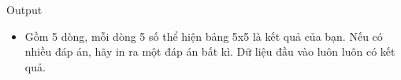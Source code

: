 Output
\begin{itemize}
	\item Gồm 5 dòng, mỗi dòng 5 số thể hiện bảng 5x5 là kết quả của bạn. Nếu có nhiều đáp án, hãy in ra một đáp án bất kì. Dữ liệu đầu vào luôn luôn có kết quả.
\end{itemize}